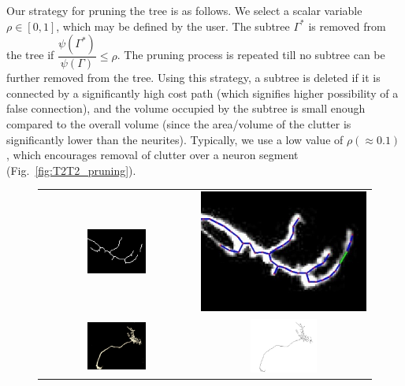 Our strategy for pruning the tree is as follows. We select a scalar variable $\rho \in \left[0,1\right]$, which may be defined by the user.  The subtree $\Gamma^*$ is removed from the tree if $\dfrac{\psi(\Gamma^*)}{\psi(\Gamma)}\leq \rho$. The pruning process is repeated till no subtree can be further removed from the tree. Using this strategy, a subtree is deleted if it is connected by a significantly high cost path (which signifies higher possibility of a false connection), and the volume occupied by the subtree is small enough compared to the overall volume (since the area/volume of the clutter is significantly lower than the neurites). Typically, we use a low value of $\rho$$ (\approx 0.1)$, which  encourages removal of clutter over a neuron segment (Fig.~\ref{fig:T2T2_pruning}).
\begin{figure}[tb]
\centering
\begin{tabular}{cc}
\includegraphics[width=0.4\textwidth]{images/ch3/broken}	&
\includegraphics[height=0.302\textwidth]{images/ch3/connected}	\\
\includegraphics[width=0.4\textwidth]{images/ch3/n4}	&
\includegraphics[width=0.4\textwidth]{images/ch3/n4_VFC}	\\

\end{tabular}
\end{figure}$$
